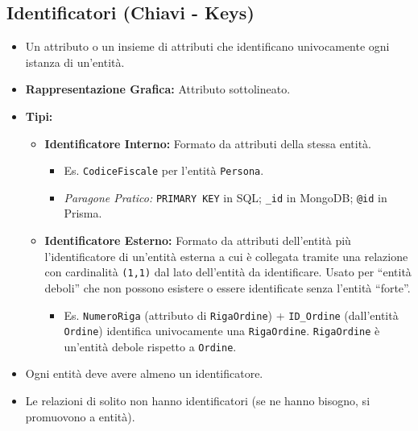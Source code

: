 \documentclass{article}
\begin{document}
	\subsection{Identificatori (Chiavi - Keys)}
	\begin{itemize}
		\item Un attributo o un insieme di attributi che identificano univocamente ogni istanza di un'entità.
		\item \textbf{Rappresentazione Grafica:} Attributo sottolineato.
		\item \textbf{Tipi:}
		\begin{itemize}
			\item \textbf{Identificatore Interno:} Formato da attributi della stessa entità.
			\begin{itemize}
				\item Es. \texttt{CodiceFiscale} per l'entità \texttt{Persona}.
				\item \textit{Paragone Pratico:} \texttt{PRIMARY KEY} in SQL; \texttt{\_id} in MongoDB; \texttt{@id} in Prisma.
			\end{itemize}
			\item \textbf{Identificatore Esterno:} Formato da attributi dell'entità più l'identificatore di un'entità esterna a cui è collegata tramite una relazione con cardinalità \texttt{(1,1)} dal lato dell'entità da identificare. Usato per ``entità deboli'' che non possono esistere o essere identificate senza l'entità ``forte''.
			\begin{itemize}
				\item Es. \texttt{NumeroRiga} (attributo di \texttt{RigaOrdine}) + \texttt{ID\_Ordine} (dall'entità \texttt{Ordine}) identifica univocamente una \texttt{RigaOrdine}. \texttt{RigaOrdine} è un'entità debole rispetto a \texttt{Ordine}.
			\end{itemize}
		\end{itemize}
		\item Ogni entità deve avere almeno un identificatore.
		\item Le relazioni di solito non hanno identificatori (se ne hanno bisogno, si promuovono a entità).
	\end{itemize}
\end{document}
